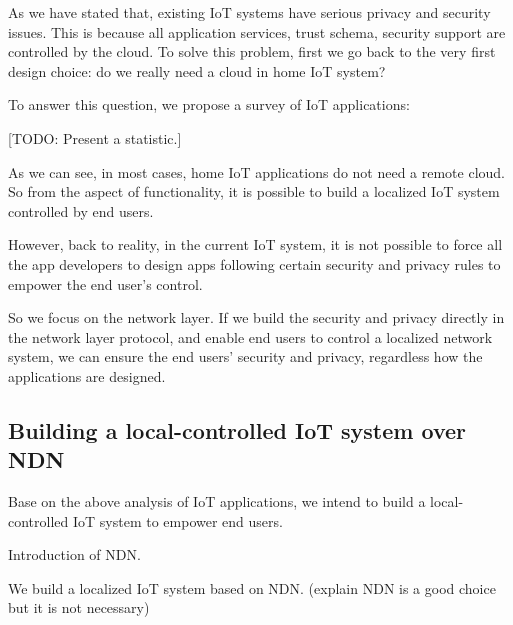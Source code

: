 As we have stated that, existing IoT systems have serious privacy and security issues. This is because all application services, trust schema, security support are controlled by the cloud. To solve this problem, first we go back to the very first design choice: do we really need a cloud in home IoT system?

To answer this question, we propose a survey of IoT applications:

[TODO: Present a statistic.]


As we can see, in most cases, home IoT applications do not need a remote cloud. So from the aspect of functionality, it is possible to build a localized IoT system controlled by end users.

However, back to reality, in the current IoT system, it is not possible to force all the app developers to design apps following certain security and privacy rules to empower the end user's control.

So we focus on the network layer. If we build the security and privacy directly in the network layer protocol, and enable end users to control a localized network system, we can ensure the end users' security and privacy, regardless how the applications are designed.

\subsection{Building a local-controlled IoT system over NDN}

Base on the above analysis of IoT applications, we intend to build a local-controlled IoT system to empower end users.

Introduction of NDN. 

We build a localized IoT system based on NDN. (explain NDN is a good choice but it is not necessary)
